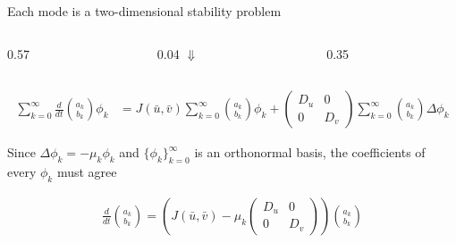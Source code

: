 \begin{frame}{Each mode is a two-dimensional stability problem}
\begin{columns}[c,onlytextwidth]
  \end{columns}

  \vspace{0.14cm}

  \begin{columns}[c,onlytextwidth]
    \begin{column}{0.57\textwidth}
      \mbox{}
    \end{column}

    \begin{column}{0.04\textwidth}
      \centering
      {\color{HydraCyan}\fontsize{15}{15}\selectfont
        $\Downarrow$
      }
    \end{column}

    \begin{column}{0.35\textwidth}
      \mbox{}
    \end{column}
  \end{columns}

  \vspace{0.14cm}

  {\color{HydraWhite}\fontsize{7.7}{9.6}\selectfont
  \begin{align*}
    \sum_{k=0}^{\infty}
    \frac{d}{dt}
    \binom{a_k}{b_k}
    \phi_k
    &=
    J(\bar u,\bar v)
    \sum_{k=0}^{\infty}
    \binom{a_k}{b_k}
    \phi_k
    +
    \begin{pmatrix}
      D_u&0\\
      0&D_v
    \end{pmatrix}
    \sum_{k=0}^{\infty}
    \binom{a_k}{b_k}
    \Delta\phi_k
  \end{align*}
  }

  \vspace{-0.30cm}

  {\color{HydraMuted}\fontsize{7.4}{9}\selectfont
    Since $\Delta\phi_k=-\mu_k\phi_k$ and
    $\{\phi_k\}_{k=0}^{\infty}$ is an orthonormal basis,
    the coefficients of every $\phi_k$ must agree
  \par}

  \vspace{-0.20cm}

  {\color{HydraWhite}\bfseries\fontsize{9.4}{11.8}\selectfont
  \begin{align*}
    \boxed{
      \frac{d}{dt}
      \binom{a_k}{b_k}
      =
      \left(
        J(\bar u,\bar v)-\mu_k
        \begin{pmatrix}
          D_u&0\\
          0&D_v
        \end{pmatrix}
      \right)
      \binom{a_k}{b_k}
    }
  \end{align*}
  }

\end{frame}


